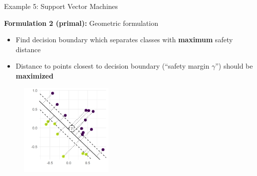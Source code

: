 \documentclass[11pt,compress,t,notes=noshow, xcolor=table]{beamer}
\begin{document}
\begin{vbframe}{Example 5: Support Vector Machines}
\framebreak 

\textbf{Formulation 2 (primal): } Geometric formulation

\begin{itemize}
	\item Find decision boundary which separates classes with \textbf{maximum} safety distance
	\item Distance to points closest to decision boundary (\enquote{safety margin $\gamma$}) should be \textbf{maximized}
\end{itemize}

\begin{figure}
	\begin{center}
		\includegraphics[width=0.4\textwidth]{figure_man/svm-example.pdf}
	\end{center}
\end{figure}

\end{vbframe}
\end{document}
